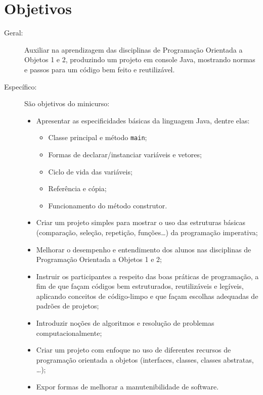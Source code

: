 \documentclass{article}
\begin{document}
\section{Objetivos}
\begin{description}
    \item[Geral:] Auxiliar na aprendizagem das disciplinas de Programação
        Orientada a Objetos 1 e 2, produzindo um projeto em console Java,
        mostrando normas e passos para um código bem feito e reutilizável.
    \item[Específico:] São objetivos do minicurso:
        \begin{itemize}[label={-}]
            \item Apresentar as especificidades básicas da linguagem Java,
                dentre elas:
                \begin{itemize}[label={-}]
                    \item Classe principal e método \texttt{main};
                    \item Formas de declarar/instanciar variáveis e vetores;
                    \item Ciclo de vida das variáveis;
                    \item Referência e cópia;
                    \item Funcionamento do método construtor.
                \end{itemize}
            \item Criar um projeto simples para mostrar o uso das estruturas
                básicas (comparação, seleção, repetição, funções\ldots) da
                programação imperativa;
            \item Melhorar o desempenho e entendimento dos alunos nas
                disciplinas de Programação Orientada a Objetos 1 e 2;
            \item Instruir os participantes a respeito das boas práticas de
                programação, a fim de que façam códigos bem estruturados,
                reutilizáveis e legíveis, aplicando conceitos de código-limpo e
                que façam escolhas adequadas de padrões de projetos;
            \item Introduzir noções de algoritmos e resolução de
                problemas computacionalmente;
            \item Criar um projeto com enfoque no uso de diferentes recursos de
                programação orientada a objetos (interfaces, classes, classes
                abstratas, \ldots);
            \item Expor formas de melhorar a manutenibilidade de software.
        \end{itemize}
\end{description}
\end{document}
